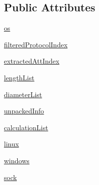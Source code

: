 \subsection*{Public Attributes}
\begin{DoxyCompactItemize}
\item 
\hyperlink{classsniffer-gui_1_1SniffThread_aae4e9a975c0424c0c193295782086432}{os}
\item 
\hyperlink{classsniffer-gui_1_1SniffThread_a5c56a7fa0d5f651aa6a0faa833d4a4f6}{filtered\-Protocol\-Index}
\item 
\hyperlink{classsniffer-gui_1_1SniffThread_a3b99343f0c1fd99f130b865d84673d66}{extracted\-Att\-Index}
\item 
\hyperlink{classsniffer-gui_1_1SniffThread_a6947f79d8ead40165ec97a649849a1c1}{length\-List}
\item 
\hyperlink{classsniffer-gui_1_1SniffThread_aca1321aa815fb8b0136d04b66ac81320}{diameter\-List}
\item 
\hyperlink{classsniffer-gui_1_1SniffThread_a6f0e80f7d8f64147f4b211012186ed99}{unpacked\-Info}
\item 
\hyperlink{classsniffer-gui_1_1SniffThread_a5e1b9ab66d028b682d2c639dbb29d32c}{calculation\-List}
\item 
\hyperlink{classsniffer-gui_1_1SniffThread_a4bb10f73021791d8addb5236a27cd56c}{linux}
\item 
\hyperlink{classsniffer-gui_1_1SniffThread_a60dcff7a710f4b3e0ba43da9d68d1afd}{windows}
\item 
\hyperlink{classsniffer-gui_1_1SniffThread_a9e37ad659560967089ee4710b9c1be26}{sock}
\end{DoxyCompactItemize}



